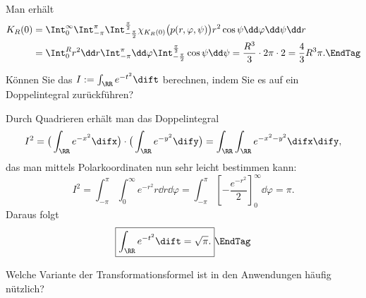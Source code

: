 \begin{antwort}
  Man erh\"alt 
  \begin{align*}
    K_R(0) &=
    \Int_0^\infty
    \Int_{-\pi}^\pi 
    \Int_{-\frac{\pi}{2}}^{\frac{\pi}{2}} 
    \chi_{K_R(0)}
    \big( p( r,\varphi,\psi) \big) r^2 \cos\psi  \dd \varphi \dd \psi \dd r \\
    &= 
    \Int_0^R r^2 \dd r
    \Int_{-\pi}^\pi \dd \varphi 
    \Int_{-\frac{\pi}{2}}^{\frac{\pi}{2}}  \cos\psi \dd \psi = 
    \frac{R^3}{3} \cdot 2\pi \cdot 2 = \frac{4}{3} R^3 \pi. \EndTag
  \end{align*}
\end{antwort} 

\begin{frage}\label{11_gaussintegral}
  Können Sie das  $I := \int_{\RR} e^{-t^2} \dift$
  berechnen, indem Sie es auf ein Doppelintegral zurückführen?
\end{frage}

\begin{antwort}
  Durch Quadrieren erhält man das Doppelintegral
  \[
  I^2 = \big( \int_{\RR} e^{-x^2} \difx \big)\cdot 
  \big( \int_{\RR} e^{-y^2} \dify \big) = 
  \int_{\RR} \int_{\RR} e^{-x^2-y^2} \difx\dify,  
  \]
  das man mittels Polarkoordinaten nun sehr leicht bestimmen kann:
  \[
  I^2 = \int_{-\pi}^\pi \int_{0}^\infty e^{-r^2} r \dd r \dd\varphi 
  = \int_{-\pi}^\pi \left[ -\frac{e^{-r^2}}{2} \right]_0^\infty \dd \varphi 
  = \pi.
  \]
  Daraus folgt 
  \[
  \boxed{\int_\RR e^{-t^2} \dift= \sqrt{\pi}.}\EndTag
  \]
\end{antwort} 

\begin{frage}
  Welche Variante der Transformationsformel ist in den Anwendungen 
  häufig nützlich?
\end{frage}

